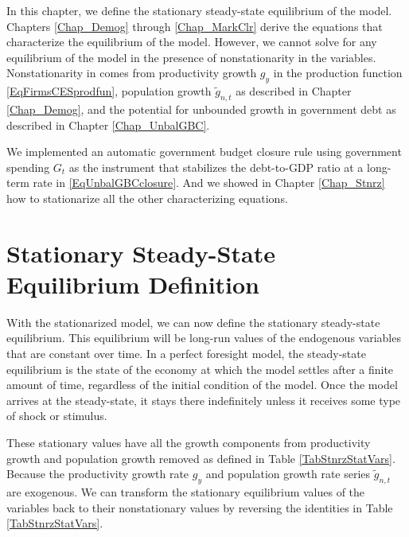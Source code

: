 
In this chapter, we define the stationary steady-state equilibrium of the \ogindia model. Chapters \ref{Chap_Demog} through \ref{Chap_MarkClr} derive the equations that characterize the equilibrium of the model. However, we cannot solve for any equilibrium of the model in the presence of nonstationarity in the variables. Nonstationarity in \ogindia comes from productivity growth $g_y$ in the production function \eqref{EqFirmsCESprodfun}, population growth $\tilde{g}_{n,t}$ as described in Chapter \ref{Chap_Demog}, and the potential for unbounded growth in government debt as described in Chapter \ref{Chap_UnbalGBC}.

We implemented an automatic government budget closure rule using government spending $G_t$ as the instrument that stabilizes the debt-to-GDP ratio at a long-term rate in \eqref{EqUnbalGBCclosure}. And we showed in Chapter \ref{Chap_Stnrz} how to stationarize all the other characterizing equations.


\section{Stationary Steady-State Equilibrium Definition}\label{SecEqlbSSdef}

  With the stationarized model, we can now define the stationary steady-state equilibrium. This equilibrium will be long-run values of the endogenous variables that are constant over time. In a perfect foresight model, the steady-state equilibrium is the state of the economy at which the model settles after a finite amount of time, regardless of the initial condition of the model. Once the model arrives at the steady-state, it stays there indefinitely unless it receives some type of shock or stimulus.

  These stationary values have all the growth components from productivity growth and population growth removed as defined in Table \ref{TabStnrzStatVars}. Because the productivity growth rate $g_y$ and population growth rate series $\tilde{g}_{n,t}$ are exogenous. We can transform the stationary equilibrium values of the variables back to their nonstationary values by reversing the identities in Table \ref{TabStnrzStatVars}.

